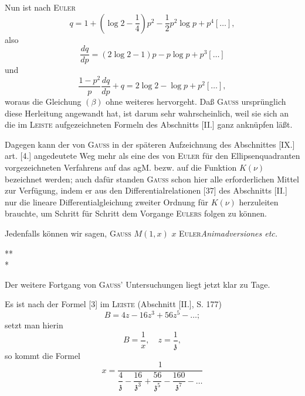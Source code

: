 \clearpage
{}
\par\indent Nun ist nach \textsc{Euler}
\[q=1+\left(\log2-\frac14\right)p^2-\frac12p^2\log p+p^4[\ldots],\]
\noindent also
\[\frac{dq}{dp}=(2\log2-1)p-p\log p+p^3[\ldots]\]
\noindent und
\[\frac{1-p^2}{p}\frac{dq}{dp}+q=2\log2-\log p+p^2[\ldots],\]
\noindent woraus die Gleichung $(\beta)$ ohne weiteres hervorgeht. Daß \textsc{Gauss} ursprünglich diese Herleitung angewandt hat, ist darum sehr wahrscheinlich, weil sie sich an die im \textsc{Leiste} aufgezeichneten Formeln des Abschnitts [II.] ganz  anknüpfen läßt.
\par\indent Dagegen kann der von \textsc{Gauss} in der späteren Aufzeichnung des Abschnittes [IX.] art. [4.] angedeutete Weg mehr als eine  des von \textsc{Euler} für den Ellipsenquadranten vorgezeichneten Verfahrens auf das agM. bezw. auf die Funktion $K(\nu)$ bezeichnet werden; auch dafür standen \textsc{Gauss} schon hier alle erforderlichen Mittel zur Verfügung, indem er aus den Differentialrelationen [37] des Abschnitts [II.] nur die lineare Differentialgleichung zweiter Ordnung für $K(\nu)$ herzuleiten brauchte, um Schritt für Schritt dem Vorgange \textsc{Eulers} folgen zu können.
\par\indent Jedenfalls können wir sagen,  \textsc{Gauss}  $M(1,x)$  $x$  \textsc{Euler}\textit{Animadversiones etc.}
\begin{center}*\hspace{2cm}*\\[-.7ex]*\end{center}
\par\indent Der weitere Fortgang von \textsc{Gauss}' Untersuchungen liegt jetzt klar zu Tage.
\par\indent Es ist nach der Formel [3] im \textsc{Leiste} (Abschnitt [II.], S. 177)
\begin{equation*}\tag*{$[3]'$}B=4z-16z^3+56z^5-\ldots;\end{equation*}
\noindent setzt man hierin
\[B=\frac1x,\quad z=\frac1{\mathfrak z},\]
\noindent so kommt die Formel
\begin{equation*}\tag*{$[10]'$}x=\frac1{\dfrac4{\mathfrak z}-\dfrac{16}{\mathfrak z^3}+\dfrac{56}{\mathfrak z^5}-\dfrac{160}{\mathfrak z^7}-\ldots}\end{equation*}
